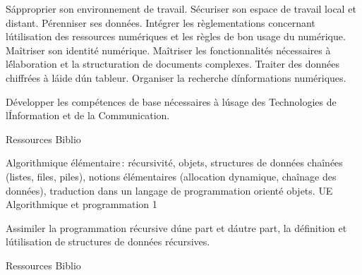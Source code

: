 \vfill

{
S\'approprier son environnement de travail. Sécuriser son espace de travail local et distant. Pérenniser ses données.
Intégrer les règlementations concernant l\'utilisation des ressources numériques et les règles de bon usage du numérique. Maîtriser son identité numérique.
Maîtriser les fonctionnalités nécessaires à l\'élaboration et la structuration de documents complexes. Traiter des données chiffrées à l\'aide d\'un tableur.
Organiser la recherche d\'informations numériques.
} 
{} 
{\begin{itemize}
 \ObjItem Développer les compétences de base nécessaires à l\'usage des Technologies de l\'Information et de la Communication. 
\end{itemize} 
} 
{Ressources} 
{Biblio} 
 
\vfill




{
Algorithmique élémentaire\,: récursivité, objets, structures de données chaînées (listes, files, piles), notions élémentaires (allocation dynamique, chaînage des données), traduction dans un langage de programmation orienté objets.
} 
{UE Algorithmique et programmation 1} 
{\begin{itemize}
 \ObjItem Assimiler la programmation récursive d\'une part et d\'autre part, la définition et l\'utilisation de structures de données récursives. 
\end{itemize} 
} 
{Ressources} 
{Biblio} 
 
